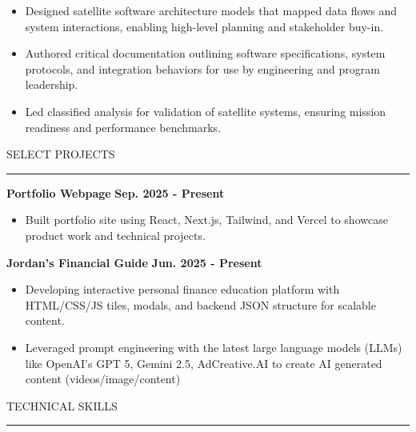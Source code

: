 \documentclass[a4paper,8pt]{article}
\begin{document}
\begin{itemize}
    \item Designed satellite software architecture models that mapped data flows and system interactions, enabling high-level planning and stakeholder buy-in.
    \item Authored critical documentation outlining software specifications, system protocols, and integration behaviors for use by engineering and program leadership.
    \item Led classified analysis for validation of satellite systems, ensuring mission readiness and performance benchmarks.
\end{itemize}

 \noindent\Large SELECT PROJECTS
 \vspace{-1mm}
 
\noindent\rule{18.5cm}{0.4pt}

 \noindent\normalsize

\noindent \normalsize \textbf{Portfolio Webpage} \hspace*{\fill} \normalsize \textbf{Sep. 2025 - Present}
\normalsize
\vspace{-1mm}
\begin{itemize}
\item Built portfolio site using React, Next.js, Tailwind, and Vercel to showcase product work and technical projects. 
\end{itemize}

\noindent \normalsize \textbf{Jordan's Financial Guide} \hspace*{\fill} \normalsize \textbf{Jun. 2025 - Present}
\normalsize
\vspace{-1mm}
\begin{itemize}

\item Developing interactive personal finance education platform with HTML/CSS/JS tiles, modals, and backend JSON structure for scalable content.
\item Leveraged prompt engineering with the latest large language models (LLMs) like OpenAI's GPT 5, Gemini 2.5, AdCreative.AI to create AI generated content (videos/image/content) 
\end{itemize}

\vspace {1mm}


\noindent\Large TECHNICAL SKILLS 
\vspace{-1mm}

\noindent\rule{18.5cm}{0.4pt}
\end{document}
